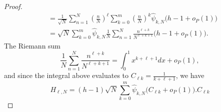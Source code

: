 \documentclass[aap]{imsart}
\begin{document}
\begin{proof}
\begin{align*}
&=  \frac{1}{\sqrt{N}} \sum_{n=1}^{N}(\tfrac{n}{N})^\ell \sum_{k=0}^m (\tfrac{n}{N})^k \widehat{\psi}_{k,N} \big( h - 1 + o_P(1) \big)   \\
&= \sqrt{N}\sum_{k=0}^m \widehat{\psi}_{k,N} \frac{1}{N} \sum_{n=1}^{N} \frac{n^{\ell + k}}{N^{\ell + k + 1}}\big( h - 1 + o_P(1)  \big).
\end{align*}
The Riemann sum
\[
\frac{1}{N} \sum_{n=1}^{N} \frac{n^{\ell + k}}{N^{\ell + k + 1}} = \int_{0}^{1}x^{k+\ell+1}dx + o_P(1),
\]
and since the integral above evaluates to $C_{\ell k} = \frac{1}{k+\ell+1}$, we have
\[
H_{\ell,N} = (h - 1)\sqrt{N}\sum_{k=0}^m \widehat{\psi}_{k,N}\big( C_{\ell k} + o_P(1)  \big).C_{\ell k}
\]
\end{proof}
\end{document}
